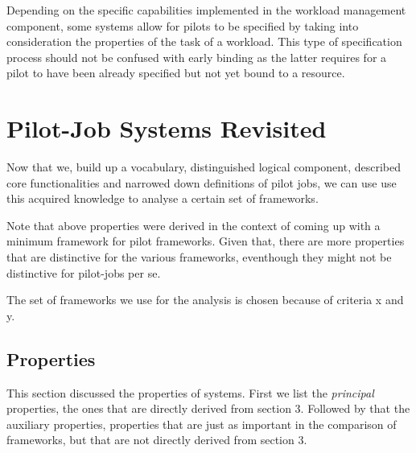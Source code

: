 \documentclass{sig-alternate}
\begin{document}
Depending on the specific capabilities implemented in the workload management
component, some \pilotjob systems allow for pilots to be specified by taking
into consideration the properties of the task of a workload. This type of
specification process should not be confused with early binding as the latter
requires for a pilot to have been already specified but not yet bound to a
resource.

\section{Pilot-Job Systems Revisited}\label{sec:4}

Now that we, build up a vocabulary, distinguished logical component, described core
functionalities and narrowed down definitions of pilot jobs, we can use use
this acquired knowledge to analyse a certain set of \pilotjob frameworks.

Note that above properties were derived in the context of coming up with a
minimum framework for pilot frameworks. Given that, there are more properties
that are distinctive for the various frameworks, eventhough they might not be
distinctive for pilot-jobs per se.

The set of frameworks we use for the analysis is chosen because of criteria x and y.


\subsection{Properties}

This section discussed the properties of \pilotjob systems. First we list the
\textit{principal} properties, the ones that are directly derived from section
3.  Followed by that the auxiliary properties, properties that are just as
important in the comparison of \pilotjob frameworks, but that are not directly
derived from section 3.
\end{document}
